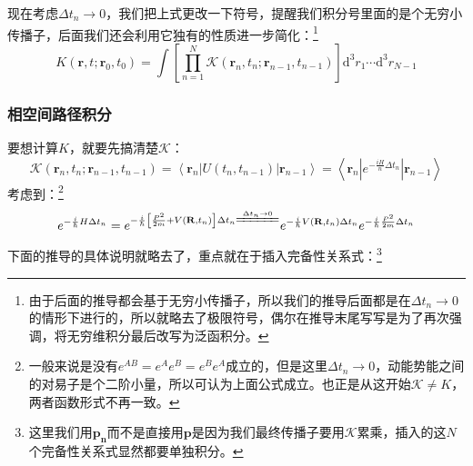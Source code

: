 \documentclass[a4paper,zihao=-4,linespread=1]{ctexrep}
\begin{document}
	现在考虑$\Delta t_n\to 0$，我们把上式更改一下符号，提醒我们积分号里面的是个无穷小传播子，后面我们还会利用它独有的性质进一步简化：\footnote{由于后面的推导都会基于无穷小传播子，所以我们的推导后面都是在$\Delta t_n\to 0$的情形下进行的，所以就略去了极限符号，偶尔在推导末尾写写是为了再次强调，将无穷维积分最后改写为泛函积分。}
	\begin{equation}
		\label{eq:6.85}
		K\left(\mathbf{r}, t ; \mathbf{r}_{0}, t_{0}\right)=\int\left[\prod_{n=1}^{N} \mathcal{K}\left(\mathbf{r}_{n}, t_{n} ; \mathbf{r}_{n-1}, t_{n-1}\right)\right] \mathrm{d}^3{r}_1 \cdots \mathrm{d}^3{r}_{N-1}
	\end{equation}
	\subsubsection{相空间路径积分}
	要想计算$K$，就要先搞清楚$\mathcal{K}$：
	\[
	\mathcal{K}\left(\mathbf{r}_{n}, t_{n} ; \mathbf{r}_{n-1}, t_{n-1}\right)=\left\langle\mathbf{r}_{n}\left|U\left(t_{n}, t_{n-1}\right)\right| \mathbf{r}_{n-1}\right\rangle=\left\langle\mathbf{r}_{n}\left|e^{-\frac{i H}{n} \Delta t_{n}}\right| \mathbf{r}_{n-1}\right\rangle
	\]
	考虑到：\footnote{一般来说是没有$e^{AB}=e^Ae^B=e^Be^A$成立的，但是这里$\Delta t_{n} \to 0$，动能势能之间的对易子是个二阶小量，所以可认为上面公式成立。也正是从这开始$\mathcal{K}\neq K$，两者函数形式不再一致。}
	\[
	e^{-\frac{i}{\hbar} H \Delta t_{n}}=e^{-\frac{i}{\hbar}\left[\frac{P^{2}}{2 m}+V\left(\mathbf{R}, t_{n}\right)\right] \Delta t_{n}\xlongequal{\Delta t_{n} \to 0}} e^{-\frac{i}{\hbar} V\left(\mathbf{R}, t_{n}\right) \Delta t_{n}} e^{-\frac{i}{\hbar} \frac{P^{2}}{2 m} \Delta t_{n}}
	\]
	下面的推导的具体说明就略去了，重点就在于插入完备性关系式：\footnote{这里我们用$\mathbf{p_n}$而不是直接用$\mathbf{p}$是因为我们最终传播子要用$\mathcal{K}$累乘，插入的这$N$个完备性关系式显然都要单独积分。}
\end{document}
